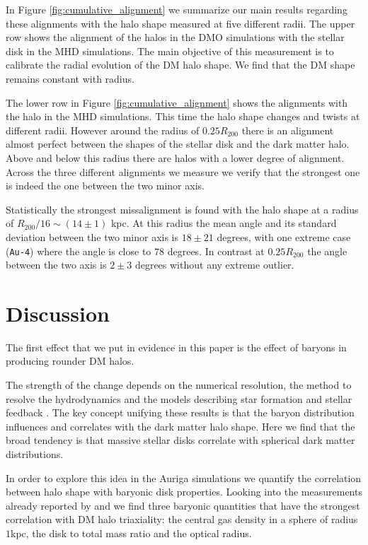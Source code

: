 \documentclass[a4paper,fleqn,usenatbib]{mnras}
\begin{document}
In Figure \ref{fig:cumulative_alignment} we summarize our main results
regarding these alignments with the halo shape measured at five
different radii.
The upper row shows the alignment of the halos in the DMO simulations
with the stellar disk in the MHD simulations.
The main objective of this measurement is to calibrate the radial
evolution of the DM halo shape. 
We find that the DM shape remains constant with radius.

The lower row in Figure \ref{fig:cumulative_alignment} shows the
alignments with the halo in the MHD simulations. 
This time the halo shape changes and twists at different radii.
However around the radius of $0.25R_{200}$ there is an alignment
almost perfect between the shapes of the stellar disk and the dark
matter halo. 
Above and below this radius there are halos with a lower degree of
alignment.
Across the three different alignments we measure we verify that the
strongest one is indeed the one between the two minor axis.

Statistically the strongest missalignment is found with the halo shape
at a radius of $R_{200}/16\sim (14\pm1)$ kpc. 
At this radius the mean angle and its standard deviation between the
two minor axis is $18 \pm 21$ degrees, with one extreme case
(\texttt{Au-4}) where the angle is close to $78$ degrees. 
In contrast at $0.25 R_{200}$ the angle between the two axis is
$2\pm 3$ degrees without any extreme outlier.





\section{Discussion}

The first effect that we put in evidence in this paper is the effect
of baryons in producing rounder DM halos.

The strength of the change depends on the numerical resolution, the
method to resolve the hydrodynamics and the models describing star
formation and stellar feedback \citep{Debattista08, Bryan13, Butsky16,
  Chua19, Artale19}.  
The key concept unifying these results is that the baryon distribution
influences and correlates with the dark matter halo shape. 
Here we find that the broad tendency is that massive stellar disks
correlate with spherical dark matter distributions. 

In order to explore this idea in the Auriga simulations we quantify
the correlation between halo shape with baryonic disk properties. 
Looking into the measurements already reported by \cite{auriga} and
\cite{Pakmor17} we find three baryonic quantities that have the
strongest correlation with DM halo triaxiality: the central gas
density in a sphere of radius $1$kpc, the disk to total mass ratio and
the optical radius.
\end{document}
